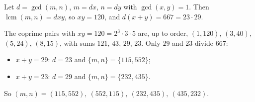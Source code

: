 Let $d=\gcd(m,n)$, $m=dx$, $n=dy$ with $\gcd(x,y)=1$. Then $\operatorname{lcm}(m,n)=dxy$, so $xy=120$, and $d(x+y)=667=23\cdot29$.

The coprime pairs with $xy=120=2^3\cdot3\cdot5$ are, up to order, $(1,120)$, $(3,40)$, $(5,24)$, $(8,15)$, with sums $121$, $43$, $29$, $23$. Only $29$ and $23$ divide $667$:
\begin{itemize}
\item $x+y=29$: $d=23$ and $\{m,n\}=\{115,552\}$;
\item $x+y=23$: $d=29$ and $\{m,n\}=\{232,435\}$.
\end{itemize}
So $(m,n)=\boxed{(115,552),\ (552,115),\ (232,435),\ (435,232)}$.
